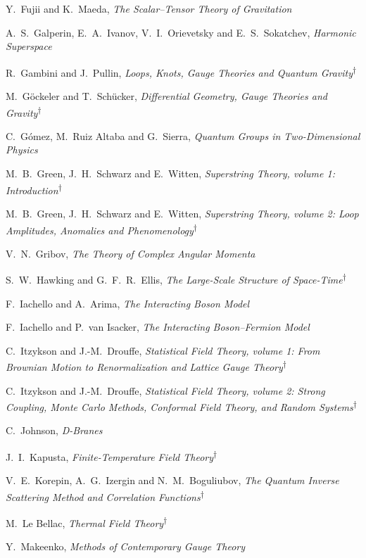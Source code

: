 \begin{list}{}{\setlength{\leftmargin}{0pt}\setlength{\rightmargin}{0pt}
\setlength{\itemsep}{2pt}\setlength{\parsep}{0pt}}
\item Y.~Fujii and K.~Maeda, \emph{The Scalar--Tensor Theory of Gravitation}
\item A.~S.~Galperin, E.~A.~Ivanov, V.~I.~Orievetsky and E.~S.~Sokatchev, \emph{Harmonic Superspace}
\item R.~Gambini and J.~Pullin, \emph{Loops, Knots, Gauge Theories and Quantum Gravity}\textsuperscript{\(\dagger\)}
\item M.~Göckeler and T.~Schücker, \emph{Differential Geometry, Gauge Theories and Gravity}\textsuperscript{\(\dagger\)}
\item C.~Gómez, M.~Ruiz Altaba and G.~Sierra, \emph{Quantum Groups in Two-Dimensional Physics}
\item M.~B.~Green, J.~H.~Schwarz and E.~Witten, \emph{Superstring Theory, volume 1: Introduction}\textsuperscript{\(\dagger\)}
\item M.~B.~Green, J.~H.~Schwarz and E.~Witten, \emph{Superstring Theory, volume 2: Loop Amplitudes, Anomalies and Phenomenology}\textsuperscript{\(\dagger\)}
\item V.~N.~Gribov, \emph{The Theory of Complex Angular Momenta}
\item S.~W.~Hawking and G.~F.~R.~Ellis, \emph{The Large-Scale Structure of Space-Time}\textsuperscript{\(\dagger\)}
\item F.~Iachello and A.~Arima, \emph{The Interacting Boson Model}
\item F.~Iachello and P.~van Isacker, \emph{The Interacting Boson--Fermion Model}
\item C.~Itzykson and J.-M.~Drouffe, \emph{Statistical Field Theory, volume 1: From Brownian Motion to Renormalization and Lattice Gauge Theory}\textsuperscript{\(\dagger\)}
\item C.~Itzykson and J.-M.~Drouffe, \emph{Statistical Field Theory, volume 2: Strong Coupling, Monte Carlo Methods, Conformal Field Theory, and Random Systems}\textsuperscript{\(\dagger\)}
\item C.~Johnson, \emph{D-Branes}
\item J.~I.~Kapusta, \emph{Finite-Temperature Field Theory}\textsuperscript{\(\dagger\)}
\item V.~E.~Korepin, A.~G.~Izergin and N.~M.~Boguliubov, \emph{The Quantum Inverse Scattering Method and Correlation Functions}\textsuperscript{\(\dagger\)}
\item M.~Le Bellac, \emph{Thermal Field Theory}\textsuperscript{\(\dagger\)}
\item Y.~Makeenko, \emph{Methods of Contemporary Gauge Theory}

\end{list}
